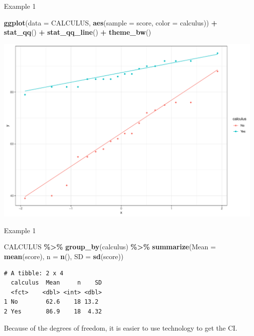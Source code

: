 \documentclass[
  ignorenonframetext,
]{beamer}
\newenvironment{Shaded}{\begin{snugshade}}{\end{snugshade}}
\newcommand{\AttributeTok}[1]{\textcolor[rgb]{0.13,0.29,0.53}{#1}}
\newcommand{\FunctionTok}[1]{\textcolor[rgb]{0.13,0.29,0.53}{\textbf{#1}}}
\newcommand{\NormalTok}[1]{#1}
\newcommand{\SpecialCharTok}[1]{\textcolor[rgb]{0.81,0.36,0.00}{\textbf{#1}}}
\begin{document}
\begin{frame}[fragile]{Example 1}
\protect\hypertarget{example-1-1}{}
\small

\begin{Shaded}
\begin{Highlighting}[]
\FunctionTok{ggplot}\NormalTok{(}\AttributeTok{data =}\NormalTok{ CALCULUS, }\FunctionTok{aes}\NormalTok{(}\AttributeTok{sample =}\NormalTok{ score, }\AttributeTok{color =}\NormalTok{ calculus)) }\SpecialCharTok{+} 
  \FunctionTok{stat\_qq}\NormalTok{() }\SpecialCharTok{+} 
  \FunctionTok{stat\_qq\_line}\NormalTok{() }\SpecialCharTok{+}
  \FunctionTok{theme\_bw}\NormalTok{()}
\end{Highlighting}
\end{Shaded}

\begin{center}\includegraphics[width=0.7\linewidth,height=0.5\textheight]{Week11_12_13_files/figure-beamer/unnamed-chunk-2-1} \end{center}
\normalsize
\end{frame}

\begin{frame}[fragile]{Example 1}
\protect\hypertarget{example-1-2}{}
\small

\begin{Shaded}
\begin{Highlighting}[]
\NormalTok{CALCULUS }\SpecialCharTok{\%\textgreater{}\%} 
  \FunctionTok{group\_by}\NormalTok{(calculus) }\SpecialCharTok{\%\textgreater{}\%} 
  \FunctionTok{summarize}\NormalTok{(}\AttributeTok{Mean =} \FunctionTok{mean}\NormalTok{(score), }\AttributeTok{n =} \FunctionTok{n}\NormalTok{(), }\AttributeTok{SD =} \FunctionTok{sd}\NormalTok{(score))}
\end{Highlighting}
\end{Shaded}

\begin{verbatim}
# A tibble: 2 x 4
  calculus  Mean     n    SD
  <fct>    <dbl> <int> <dbl>
1 No        62.6    18 13.2 
2 Yes       86.9    18  4.32
\end{verbatim}

\normalsize

Because of the degrees of freedom, it is easier to use technology to get
the CI.
\end{frame}
\end{document}
